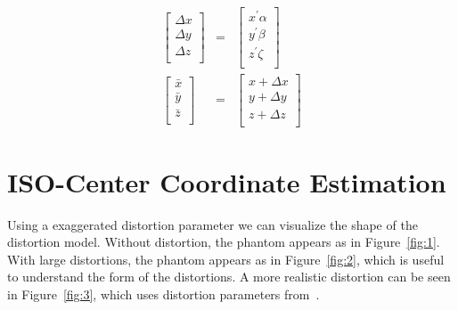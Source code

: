 \begin{eqnarray}
\begin{bmatrix}
  \Delta x \\
  \Delta y \\
  \Delta z \\
\end{bmatrix}
& = &
\begin{bmatrix}
x^\prime \alpha \\
y^\prime \beta \\
z^\prime \zeta \\
\end{bmatrix}
\label{eq2}
\\
\begin{bmatrix}
\bar{x} \\
\bar{y} \\
\bar{z} \\
\end{bmatrix}
& = &
\begin{bmatrix}
x + \Delta x \\
y + \Delta y \\
z + \Delta z \\
\end{bmatrix}
\label{eq3}
\end{eqnarray}

\section{ISO-Center Coordinate Estimation}

Using a exaggerated distortion parameter we can visualize the shape of the distortion model. Without distortion, the phantom appears as in Figure~\ref{fig:1}.  With large distortions, the phantom appears as in Figure~\ref{fig:2}, which is useful to understand the form of the distortions.  A more realistic distortion can be seen in Figure~\ref{fig:3}, which uses distortion parameters from~\cite{LSS08b}.


